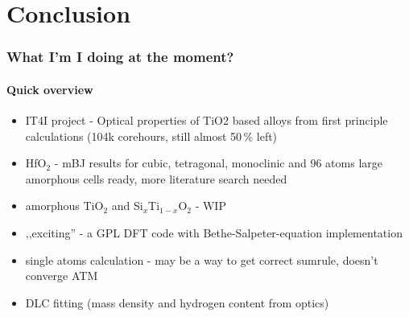 \documentclass{beamer}
\begin{document}
\section{Conclusion}

\begin{frame}
    \frametitle{What I'm I doing at the moment?}
    \framesubtitle{Quick overview}

	\begin{itemize}
	\item IT4I project - Optical properties of TiO2 based alloys from first principle calculations (104k corehours, still almost 50\,\% left)

	\item HfO$_2$ - mBJ results for cubic, tetragonal, monoclinic and 96 atoms large amorphous cells ready, more literature search needed

	\item amorphous TiO$_2$ and Si$_x$Ti$_{1-x}$O$_2$ - WIP

	\item ,,exciting'' - a GPL DFT code with Bethe-Salpeter-equation implementation

	\item single atoms calculation - may be a way to get correct sumrule, doesn't converge ATM

	\item DLC fitting (mass density and hydrogen content from optics)

	\end{itemize}

\end{frame}
\end{document}
